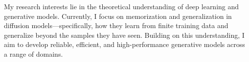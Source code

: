 
\begin{cvparagraph}
{\small
My research interests lie in the theoretical understanding of deep learning and generative models. Currently, I focus on memorization and generalization in diffusion models---specifically, how they learn from finite training data and generalize beyond the samples they have seen. Building on this understanding, I aim to develop reliable, efficient, and high-performance generative models across a range of domains.
}
\end{cvparagraph}